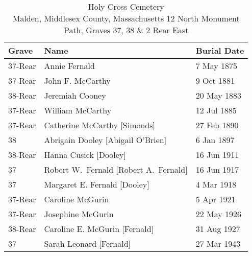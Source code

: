 \begin{table}[ht]
	\centering
	\caption{Holy Cross Cemetery\cite{HolyCrossPlotFernald} \\
		Malden, Middlesex County, Massachusetts
		12 North Monument Path, Graves 37, 38 \& 2 Rear East}
	\begin{tabular}{|l|l|l|}
		\hline
		\textbf{Grave} & \textbf{Name} & \textbf{Burial Date} \\
		\hline
		37-Rear & Annie Fernald\index{Fernald!Anna\textsuperscript{4}} & 7 May 1875 \\ \hline
		37-Rear & John F. McCarthy\index{McCarthy!John F.\textsuperscript{5}} & 9 Oct 1881 \\ \hline
		38-Rear & Jeremiah Cooney\index{Cooney!Jeremiah} & 20 May 1883 \\ \hline
		37-Rear & William McCarthy\index{McCarthy!William\textsuperscript{5}} & 12 Jul 1885 \\ \hline
		37-Rear & Catherine McCarthy [Simonds]\index{Simonds!Catharine\textsuperscript{4}}\index{McCarthy!Catharine\textsuperscript{4} (Simonds)} & 27 Feb 1890 \\ \hline
		38 & Abrigain Dooley [Abigail O'Brien]\index{O'Brien!Abigail\textsuperscript{2}}\index{Dooley!Abigail\textsuperscript{2} (O'Brien)} & 6 Jan 1897 \\ \hline
		38-Rear & Hanna Cusick [Dooley]\index{Dooley!Hannah/Hanora\textsuperscript{3}}\index{Cooney!Hannah/Hanora\textsuperscript{3} (Dooley)}\index{Cusick!Hannah/Hanora\textsuperscript{3} (Dooley) (Cooney)} & 16 Jun 1911 \\ \hline
		37 & Robert W.\ Fernald [Robert A.\ Fernald]\index{Fernald!Robert} & 16 Jun 1917 \\ \hline
		37 & Margaret E. Fernald [Dooley]\index{Dooley!Margaret\textsuperscript{3}}\index{Fernald!Margaret\textsuperscript{3} (Dooley) (Simonds)}\index{Simonds!Margaret\textsuperscript{3} (Dooley)} & 4 Mar 1918 \\ \hline
		37-Rear & Caroline McGurin\index{McGurin!Caroline Josephine\textsuperscript{5}} & 5 Apr 1921 \\ \hline
		37-Rear & Josephine McGurin\index{McGurin!Josephine\textsuperscript{5}} & 22 May 1926 \\ \hline
		38-Rear & Caroline E. McGurin [Fernald]\index{Fernald!Caroline Emma\textsuperscript{4}}\index{McGurin!Caroline Emma\textsuperscript{4} (Fernald)} & 31 Aug 1927 \\ \hline
		37 & Sarah Leonard [Fernald]\index{Fernald!Sarah Helen\textsuperscript{4}}\index{Leonard!Sarah Helen\textsuperscript{4} (Fernald)} & 27 Mar 1943 \\ \hline

\end{tabular}
\end{table}
